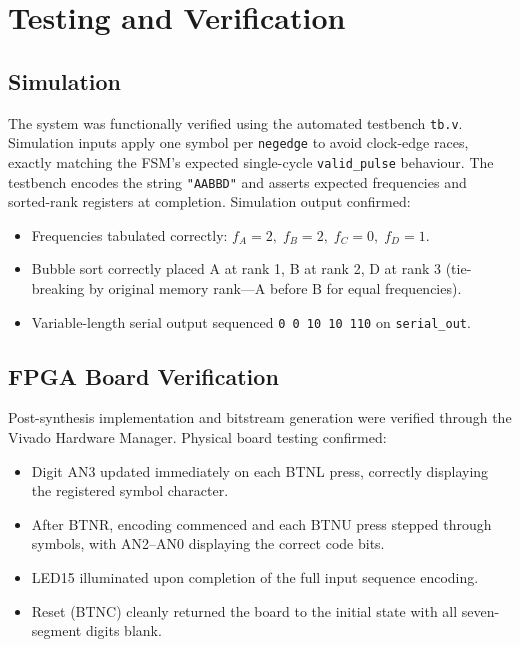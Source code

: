 \documentclass[12pt,a4paper]{article}
\begin{document}
\section{Testing and Verification}

\subsection{Simulation}
The system was functionally verified using the automated testbench \texttt{tb.v}.
Simulation inputs apply one symbol per \texttt{negedge} to avoid clock-edge races,
exactly matching the FSM's expected single-cycle \texttt{valid\_pulse} behaviour.
The testbench encodes the string \texttt{"AABBD"} and asserts expected frequencies
and sorted-rank registers at completion. Simulation output confirmed:
\begin{itemize}
  \item Frequencies tabulated correctly: $f_A = 2,\; f_B = 2,\; f_C = 0,\; f_D = 1$.
  \item Bubble sort correctly placed A at rank 1, B at rank 2, D at rank 3
        (tie-breaking by original memory rank—A before B for equal frequencies).
  \item Variable-length serial output sequenced \texttt{0 0 10 10 110} on
        \texttt{serial\_out}.
\end{itemize}

\subsection{FPGA Board Verification}
Post-synthesis implementation and bitstream generation were verified through the
Vivado Hardware Manager. Physical board testing confirmed:
\begin{itemize}
  \item Digit AN3 updated immediately on each BTNL press, correctly displaying the
        registered symbol character.
  \item After BTNR, encoding commenced and each BTNU press stepped through symbols,
        with AN2--AN0 displaying the correct code bits.
  \item LED15 illuminated upon completion of the full input sequence encoding.
  \item Reset (BTNC) cleanly returned the board to the initial state with all
        seven-segment digits blank.
\end{itemize}
\end{document}

